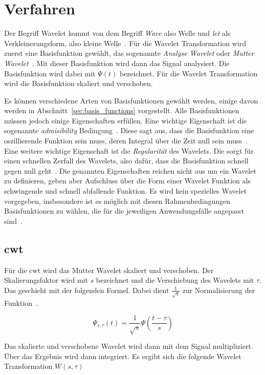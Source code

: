 \documentclass[12pt, a4paper, ngerman]{article}
\begin{document}
\section{Verfahren}
\label{sec:verfahren}

Der Begriff Wavelet kommt von dem Begriff \emph{Wave} also Welle
und \emph{let} als Verkleinerungsform, also kleine Welle~\cite[S.2]{wavelet_patterns}.
Für die Wavelet Transformation wird zuerst eine Basisfunktion gewählt,
das sogenannte \emph{Analyse Wavelet} oder \emph{Mutter Wavelet}~\cite{wavelets_intro}.
Mit dieser Basisfunktion wird dann das Signal analysiert.
Die Basisfunktion wird dabei mit \(\Psi(t)\) bezeichnet.
Für die Wavelet Transformation wird die Basisfunktion skaliert und verschoben.

Es können verschiedene Arten von Basisfunktionen gewählt werden,
einige davon werden in Abschnitt~\ref{sec:basis_functions} vorgestellt.
Alle Basisfunktionen müssen jedoch einige Eigenschaften erfüllen.
Eine wichtige Eigenschaft ist die sogenannte \emph{admisibility} Bedingung~\cite[S.6]{friendly_wavelet}.
Diese sagt aus, dass die Basisfunktion eine oszillierende Funktion sein muss,
deren Integral über die Zeit null sein muss~\cite[S.6]{friendly_wavelet}.
Eine weitere wichtige Eigenschaft ist die \emph{Regularität} des Wavelets.
Die sorgt für einen schnellen Zerfall des Wavelets, also dafür, 
dass die Basisfunktion schnell gegen null geht~\cite[S.6]{friendly_wavelet}.
Die genannten Eigenschaften reichen nicht aus um ein Wavelet zu definieren,
geben aber Aufschluss über die Form einer Wavelet Funktion
als schwingende und schnell abfallende Funktion.
Es wird kein spezielles Wavelet vorgegeben,
insbesondere ist es möglich mit diesen Rahmenbedingungen Basisfunktionen zu wählen,
die für die jeweiligen Anwendungsfälle angepasst sind~\cite[S.5]{friendly_wavelet}.

\subsection{\acl{cwt}}

Für die \acf{cwt} wird das Mutter Wavelet skaliert und verschoben.
Der Skalierungsfaktor wird mit \(s\) bezeichnet
und die Verschiebung des Wavelets mit \(\tau\).
Das geschieht mit der folgenden Formel.
Dabei dient \(\frac{1}{\sqrt{s}}\) zur Normalisierung der Funktion~\cite[S.5]{friendly_wavelet}.

\[
  \Psi_{s,\tau}(t)=\frac{1}{\sqrt{s}}\Psi(\frac{t-\tau}{s})
\]

Das skalierte und verschobene Wavelet wird dann mit dem Signal multipliziert.
Über das Ergebnis wird dann integriert.
Es ergibt sich die folgende Wavelet Transformation \(W(s,\tau)\)~\cite[S.5]{friendly_wavelet}
\end{document}
